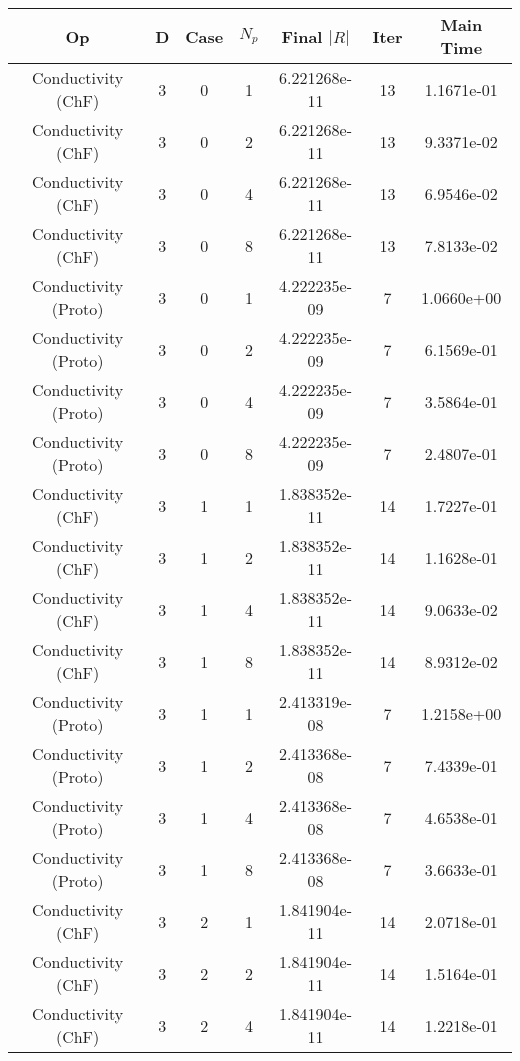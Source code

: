 \documentclass{article}
\begin{document}
\begin{small} 
  \begin{table} 
    \begin{center}
      \begin{tabular}{|c|c|c|c|c|c||c|} \hline 
Op & D & Case & $N_p$ & Final $|R|$  &  Iter & Main Time \\  
        \hline 
        Conductivity    (ChF) & 3 & 0 & 1& 6.221268e-11 & 13 & 1.1671e-01\\
        Conductivity    (ChF) & 3 & 0 & 2& 6.221268e-11 & 13 & 9.3371e-02\\
        Conductivity    (ChF) & 3 & 0 & 4& 6.221268e-11 & 13 & 6.9546e-02\\
        Conductivity    (ChF) & 3 & 0 & 8& 6.221268e-11 & 13 & 7.8133e-02\\
        Conductivity  (Proto) & 3 & 0 & 1& 4.222235e-09 & 7 & 1.0660e+00\\
        Conductivity  (Proto) & 3 & 0 & 2& 4.222235e-09 & 7 & 6.1569e-01\\
        Conductivity  (Proto) & 3 & 0 & 4& 4.222235e-09 & 7 & 3.5864e-01\\
        Conductivity  (Proto) & 3 & 0 & 8& 4.222235e-09 & 7 & 2.4807e-01\\
        \hline 
        Conductivity    (ChF) & 3 & 1 & 1& 1.838352e-11 & 14 & 1.7227e-01\\
        Conductivity    (ChF) & 3 & 1 & 2& 1.838352e-11 & 14 & 1.1628e-01\\
        Conductivity    (ChF) & 3 & 1 & 4& 1.838352e-11 & 14 & 9.0633e-02\\
        Conductivity    (ChF) & 3 & 1 & 8& 1.838352e-11 & 14 & 8.9312e-02\\
        Conductivity  (Proto) & 3 & 1 & 1& 2.413319e-08 & 7 & 1.2158e+00\\
        Conductivity  (Proto) & 3 & 1 & 2& 2.413368e-08 & 7 & 7.4339e-01\\
        Conductivity  (Proto) & 3 & 1 & 4& 2.413368e-08 & 7 & 4.6538e-01\\
        Conductivity  (Proto) & 3 & 1 & 8& 2.413368e-08 & 7 & 3.6633e-01\\
        \hline 
        Conductivity    (ChF) & 3 & 2 & 1& 1.841904e-11 & 14 & 2.0718e-01\\
        Conductivity    (ChF) & 3 & 2 & 2& 1.841904e-11 & 14 & 1.5164e-01\\
        Conductivity    (ChF) & 3 & 2 & 4& 1.841904e-11 & 14 & 1.2218e-01\\

\end{tabular}
\end{center}
\end{table}
\end{small}
\end{document}
